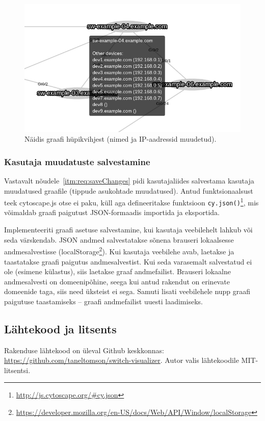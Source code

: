 \documentclass[12pt]{article}
\begin{document}
\begin{figure} [ht] %
\begin{center}
\includegraphics[width=1\textwidth]{tooltip}
    \caption{Näidis graafi hüpikvihjest (nimed ja IP-aadressid muudetud).}
\label{fig:tooltip}
\end{center}
\end{figure}

\subsubsection{Kasutaja muudatuste salvestamine} \label{saveChanges}
Vastavalt nõudele~\ref{itm:req:saveChanges} pidi kasutajaliides salvestama kasutaja muudatused
graafile (tippude asukohtade muudatused).
Antud funktsionaalsust teek cytoscape.js otse ei paku, küll aga defineeritakse funktsioon
\texttt{cy.json()}\footnote{\url{http://js.cytoscape.org/\#cy.json}}, mis võimaldab graafi paigutust
JSON-formaadis importida ja eksportida.

Implementeeriti graafi asetuse salvestamine, kui kasutaja veebilehelt lahkub või seda värskendab.
JSON andmed salvestatakse sõnena brauseri lokaalsesse andmesalvestisse
(localStorage\footnote{\url{https://developer.mozilla.org/en-US/docs/Web/API/Window/localStorage}}).
Kui kasutaja veebilehe avab, laetakse ja taastatakse graafi paigutus andmesalvestist.
Kui seda varasemalt salvestatud ei ole (esimene külastus), siis laetakse graaf andmefailist.
Brauseri lokaalne andmesalvesti on domeenipõhine, seega kui antud rakendut on erinevate domeenide
taga, siis need üksteist ei sega.
Samuti lisati veebilehele nupp graafi paigutuse taastamiseks -- graafi andmefailist uuesti
laadimiseks.

\subsection{Lähtekood ja litsents}
Rakenduse lähtekood on üleval Github keskkonnas: \url{https://github.com/taneltomson/switch-visualizer}.
Autor valis lähtekoodile MIT-litsentsi.
\end{document}
